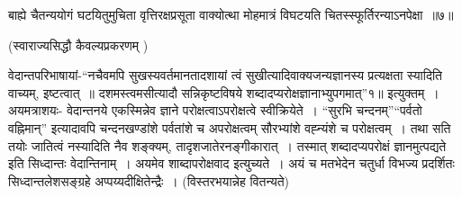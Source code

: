 {बाह्ये चैतन्ययोगं घटयितुमुचिता वृत्तिरक्षप्रसूता वाक्योत्था मोहमात्रं विघटयति चितस्स्फूर्तिरन्याऽनपेक्षा~॥७॥

(स्वाराज्यसिद्धौ कैवल्यप्रकरणम् )

वेदान्तपरिभाषायां-“नचैवमपि सुखस्यवर्तमानतादशायां त्वं सुखीत्यादिवाक्यजन्यज्ञानस्य प्रत्यक्षता स्यादिति वाच्यम्, इष्टत्वात्~॥ दशमस्त्वमसीत्यादौ सन्निकृष्टविषये शब्दादप्यरोक्षज्ञानाभ्युपगमात्”१॥ इत्युक्तम्~। अयमत्राशयः- वेदान्तनये एकस्मिन्नेव ज्ञाने परोक्षत्वाऽपरोक्षत्वे स्वीक्रियेते~। “सुरभि चन्दनम्”“पर्वतो वह्निमान्” इत्यादावपि चन्दनखण्डांशे पर्वतांशे च अपरोक्षत्वम्  सौरभ्यांशे वह्न्यंशे च परोक्षत्वम्~। तथा सति तयोः जातित्वं नस्यादिति नैव शङ्क्यम्, तादृशजातेरनङ्गीकारात्~। तस्मात् शब्दादप्यपरोक्षं ज्ञानमुत्पद्यते इति सिध्दान्तः वेदान्तिनाम्~। अयमेव शाब्दापरोक्षवाद इत्युच्यते~। अयं च मतभेदेन चतुर्धा विभज्य प्रदर्शितः सिध्दान्तलेशसङ्ग्रहे अप्पय्यदीक्षितेन्द्रैः~। (विस्तरभयान्नेह वितन्यते)

\articleend
}
